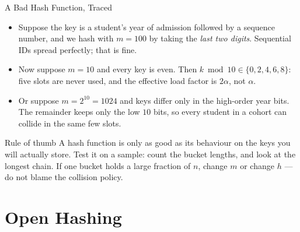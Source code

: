 \documentclass[aspectratio=169]{beamer}
\begin{document}
\begin{frame}{A Bad Hash Function, Traced}
  \begin{itemize}
    \item Suppose the key is a student's year of admission followed by a
      sequence number, and we hash with $m=100$ by taking the \emph{last two
      digits}. Sequential IDs spread perfectly; that is fine.
    \item Now suppose $m = 10$ and every key is even. Then $k \bmod 10 \in
      \{0,2,4,6,8\}$: five slots are never used, and the effective load factor
      is $2\alpha$, not $\alpha$.
    \item Or suppose $m=2^{10}=1024$ and keys differ only in the high-order
      year bits. The remainder keeps only the low $10$ bits, so every student
      in a cohort can collide in the same few slots.
  \end{itemize}
  \begin{exampleblock}{Rule of thumb}
    A hash function is only as good as its behaviour on the keys you will
    actually store. Test it on a sample: count the bucket lengths, and look at
    the longest chain. If one bucket holds a large fraction of $n$, change $m$
    or change $h$ --- do not blame the collision policy.
  \end{exampleblock}
\end{frame}


\section{Open Hashing}

\end{document}
